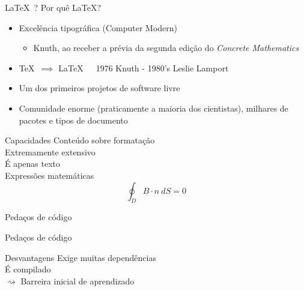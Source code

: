 \documentclass{beamer}
\begin{document}
  \begin{frame}{\LaTeX\ ?}
    Por quê \LaTeX?\\\pause
    \begin{itemize}
      \item{\selectfont Excelência tipográfica (Computer Modern)\pause
        \begin{itemize}
          \item Knuth, ao receber a prévia da segunda edição do {\em Concrete Mathematics}\pause
        \end{itemize}}
      \item \TeX\ $\implies$ \LaTeX\ \ \ \scriptsize{1976 Knuth - 1980's Leslie Lamport}\pause
      \item Um dos primeiros projetos de software livre\pause
      \item Comunidade enorme (praticamente a maioria dos cientistas), milhares de pacotes e tipos de documento
    \end{itemize}
  \end{frame}
  \begin{frame}{Capacidades}
     Conteúdo sobre formatação\\\pause
    \onslide<2>{$ \rightarrow $} Extremamente extensivo\\\pause
     É apenas texto\\\pause
     Expressões matemáticas\\\pause 
      $$ \oint_{D} B\cdot n\ dS = 0 $$ 
    \pause\href{doc/rogers}{}
  \end{frame}
  \lstset{extendedchars=false,language=tex,basicstyle=\ttfamily}
  \begin{frame}{Pedaços de código}
    
  \end{frame}
  \begin{frame}{Pedaços de código}
    
  \end{frame}
  \begin{frame}{Desvantagens}
     Exige muitas dependências\\\pause
    \onslide<2->{ $ \rightsquigarrow $ } É compilado\\\pause
     Barreira inicial de aprendizado
  \end{frame}
\end{document}
